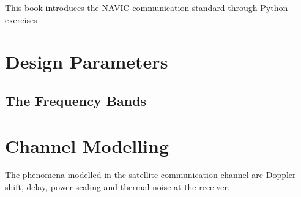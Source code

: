 \documentclass[11pt]{book}
\begin{document}

\setcounter{page}{1}

\begin{introduction}
This book introduces the NAVIC communication standard through Python exercises

\end{introduction}

\mainmatter
\chapter{Design Parameters}
\section{The Frequency Bands}


\chapter{Channel Modelling}
The phenomena modelled in the satellite communication channel are Doppler shift, delay, power scaling and thermal noise at the receiver.
\end{document}
